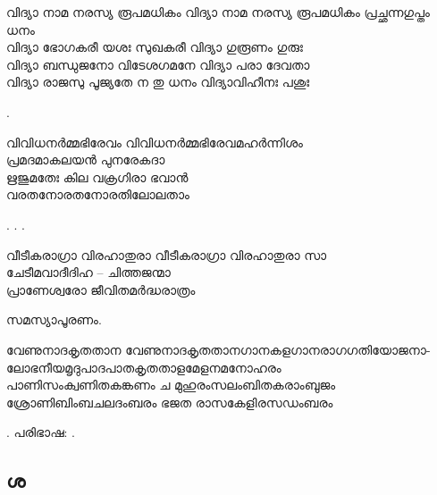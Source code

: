 \begin{enumerate}

\begin{slokam}{\VSv}{\BH}{വിദ്യാ നാമ നരസ്യ രൂപമധികം}
 വിദ്യാ നാമ നരസ്യ രൂപമധികം പ്രച്ഛന്നഗുപ്തം ധനം\\
വിദ്യാ ഭോഗകരീ യശഃ സുഖകരീ വിദ്യാ ഗുരൂണം ഗുരുഃ\\
വിദ്യാ ബന്ധുജനോ വിടേശഗമനേ വിദ്യാ പരാ ദേവതാ\\
വിദ്യാ രാജസു പൂജ്യതേ ന തു ധനം വിദ്യാവിഹീനഃ പശുഃ
\end{slokam}


.

\begin{slokam}{\VDv}{\Melp}{വിവിധനര്‍മ്മഭിരേവം}
വിവിധനര്‍മ്മഭിരേവമഹര്‍ന്നിശം\\
പ്രമദമാകലയന്‍ പുനരേകദാ\\
ഋജുമതേഃ കില വക്രഗിരാ ഭവാന്‍\\
വരതനോരതനോരതിലോലതാം
\end{slokam}


. 
. .


\begin{slokam}{\VIv}{\Unk}{വീടീകരാഗ്രാ വിരഹാതുരാ}
 വീടീകരാഗ്രാ വിരഹാതുരാ സാ\\
ചേടീമവാദീദിഹ -- ചിത്തജന്മാ\\
പ്രാണേശ്വരോ ജീവിതമർദ്ധരാത്രം\\
\end{slokam}


സമസ്യാപൂരണം.

\begin{slokam}{\VKm}{\Melp}{വേണുനാദകൃതതാന}
വേണുനാദകൃതതാനഗാനകളഗാനരാഗഗതിയോജനാ-\\
ലോഭനീയമൃദുപാദപാതകൃതതാളമേളനമനോഹരം\\
പാണിസംക്വണിതകങ്കണം ച മുഹുരംസലംബിതകരാംബുജം\\
ശ്രോണിബിംബചലദംബരം ഭജത രാസകേളിരസഡംബരം
\end{slokam}


. പരിഭാഷ: .


\end{enumerate}

\subsection{ശ}

